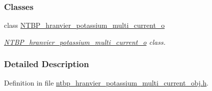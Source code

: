 \subsubsection*{Classes}
\begin{DoxyCompactItemize}
\item 
class \hyperlink{class_n_t_b_p__hranvier__potassium__multi__current__o}{NTBP\_\-hranvier\_\-potassium\_\-multi\_\-current\_\-o}
\begin{DoxyCompactList}\small\item\em \hyperlink{class_n_t_b_p__hranvier__potassium__multi__current__o}{NTBP\_\-hranvier\_\-potassium\_\-multi\_\-current\_\-o} class. \item\end{DoxyCompactList}\end{DoxyCompactItemize}


\subsubsection{Detailed Description}


Definition in file \hyperlink{ntbp__hranvier__potassium__multi__current__obj_8h_source}{ntbp\_\-hranvier\_\-potassium\_\-multi\_\-current\_\-obj.h}.

